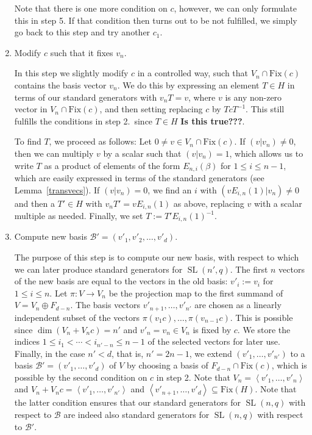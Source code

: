 \documentclass[a4paper,11pt]{article}
\def\SL{\operatorname{SL}}
\newcommand{\Fix}[1]{\mathrm{Fix}(#1)}
\newcommand{\fixme}[1]{\textbf{#1}}
\newcommand{\B}{\mathcal{B}}
\begin{document}
\begin{enumerate}
Note that there is one more condition on $c$, however, we can only
formulate this in step 5. If that condition then turns out to be not fulfilled,
we simply go back to this step and try another $c_1$.

\item Modify $c$ such that it fixes $v_n$.

In this step we slightly modify $c$ in a controlled way, such that
$V_n \cap \Fix c$ contains the basis vector $v_n$. We do this by expressing
an element $T \in H$ in terms of our standard generators with $v_nT
= v$, where $v$ is any non-zero vector in $V_n \cap \Fix c$,
and then setting replacing $c$ by $Tc T^{-1}$. This still fulfills
the conditions in step 2.~since $T \in H$ \fixme{Is this true???}.

To find $T$, we proceed as follows: Let $0 \neq v \in V_n \cap \Fix c$.
If $(v|v_n) \neq 0$, then we can multiply $v$ by a scalar such that
$(v | v_n) = 1$, which allows us to write $T$ as a product of
elements of the form $E_{n,i}(\beta)$ for $1 \le i \le n-1$, 
which are easily expressed
in terms of the standard generators (see Lemma~\ref{transvecs}). 
If $(v|v_n) = 0$, we find an $i$ with $(vE_{i,n}(1)|v_n) \neq 0$ and
then a $T' \in H$ with $v_n T' = vE_{i,n}(1)$ as above,
replacing $v$ with a scalar multiple as needed. Finally, we set
$T := T' E_{i,n}(1)^{-1}$.
\item Compute new basis $\B' = (v'_1,v'_2,\ldots,v'_d)$.

The purpose of this step is to compute our new basis, with respect to
which we can later produce standard generators for $\SL(n',q)$.
The first $n$ vectors of the new basis are equal to the vectors in
the old basis: $v'_i := v_i$ for $1 \le i \le n$.
Let $\pi: V \to V_n$ be the projection map to the first summand of
$V = V_n \oplus F_{d-n}$. The basis vectors
$v'_{n+1}, \ldots, v'_{n'}$ are chosen as a linearly independent subset
of the vectors $\pi(v_1c), \ldots, \pi(v_{n-1}c)$. This is possible
since $\dim(V_n + V_n c) = n'$ and $v'_n=v_n \in V_n$ is fixed by $c$.
We store the indices $1 \le i_1 < \cdots < i_{n'-n} \le n-1$ of the
selected vectors for later use. Finally, in the case $n' < d$, that is,
$n'=2n-1$, we extend $(v'_1, \ldots, v'_{n'})$ to a basis $\B' = (v'_1,
\ldots, v'_d)$ of $V$ by choosing a basis of $F_{d-n} \cap \Fix c$, which
is possible by the second condition on $c$ in step 2. Note that $V_n =
\left< v'_1, \ldots, v'_n\right>$ and $V_n + V_nc = \left< v'_1, \ldots,
v'_{n'}\right>$ and $\left< v'_{n+1}, \ldots, v'_d\right> \subseteq \Fix
H$. Note that the latter condition ensures that our standard generators
for $\SL(n,q)$ with respect to $\B$ are indeed also standard generators
for $\SL(n,q)$ with respect to $\B'$.


\end{enumerate}
\end{document}
